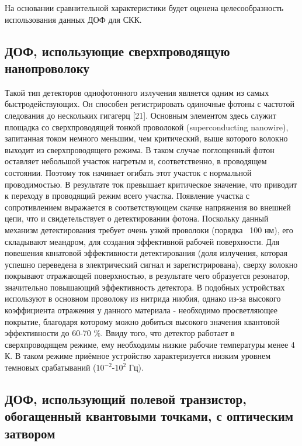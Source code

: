 На основании сравнительной характеристики будет оценена целесообразность использования данных ДОФ для СКК.


\subsection{ДОФ, использующие сверхпроводящую нанопроволоку} \label{subsec:ch1/sec5/sub1}

Такой тип детекторов однофотонного излучения является одним из самых быстродействующих. Он способен регистрировать одиночные фотоны с частотой следования до нескольких гигагерц [21]. Основным элементом здесь служит площадка со сверхпроводящей тонкой проволокой (superconducting nanowire), запитанная током немного меньшим, чем критический, выше которого волокно выходит из сверхпроводящего режима. В таком случае поглощенный фотон оставляет небольшой участок нагретым и, соответственно, в проводящем состоянии. Поэтому ток начинает огибать этот участок с нормальной проводимостью. В результате ток превышает критическое значение, что приводит к переходу в проводящий режим всего участка. Появление участка с сопротивлением выражается в соответствующем скачке напряжения во внешней цепи, что и свидетельствует о детектировании фотона. Поскольку данный механизм детектирования требует очень узкой проволоки (порядка ~100 нм), его складывают меандром, для создания эффективной рабочей поверхности. Для повешения квнатовой эффективности детектирования (доля излучения, которая успешно переведена в электрический сигнал и зарегистрирована), сверху волокно покрывают отражающей поверхностью, в результате чего образуется резонатор, значительно повышающий эффективность детектора. В подобных устройствах используют в основном проволоку из нитрида ниобия, однако из-за высокого коэффициента отражения у данного материала - необходимо просветляющее покрытие, благодаря которому можно добиться высокого значения квантовой эффективности до 60-70 \%. Ввиду того, что детектор работает в сверхпроводящем режиме, ему необходимы низкие рабочие температуры менее 4 К. В таком режиме приёмное устройство характеризуется низким уровнем темновых срабатываний ($10^{-2}$-$10^2$ Гц).

\subsection{ДОФ, использующий полевой транзистор, обогащенный квантовыми точками, с оптическим затвором} \label{subsec:ch1/sec5/sub2}


